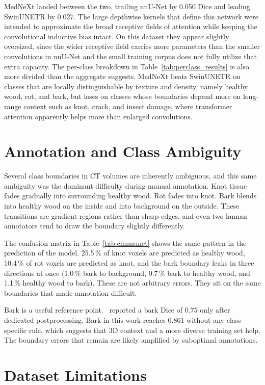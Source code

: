 MedNeXt landed between the two, trailing nnU-Net by 0.050 Dice and leading SwinUNETR by 0.027. The large depthwise kernels that define this network were intended to approximate the broad receptive fields of attention while keeping the convolutional inductive bias intact. On this dataset they appear slightly oversized, since the wider receptive field carries more parameters than the smaller convolutions in nnU-Net and the small training corpus does not fully utilize that extra capacity. The per-class breakdown in Table~\ref{tab:perclass_results} is also more divided than the aggregate suggests. MedNeXt beats SwinUNETR on classes that are locally distinguishable by texture and density, namely healthy wood, rot, and bark, but loses on classes whose boundaries depend more on long-range context such as knot, crack, and insect damage, where transformer attention apparently helps more than enlarged convolutions.
\section{Annotation and Class Ambiguity}

Several class boundaries in CT volumes are inherently ambiguous, and this same ambiguity was the dominant difficulty during manual annotation. Knot tissue fades gradually into surrounding healthy wood. Rot fades into knot. Bark blends into healthy wood on the inside and into background on the outside. These transitions are gradient regions rather than sharp edges, and even two human annotators tend to draw the boundary slightly differently.

The confusion matrix in Table~\ref{tab:cmnnunet} shows the same pattern in the prediction of the model. 25.5\,\% of knot voxels are predicted as healthy wood, 10.4\,\% of rot voxels are predicted as knot, and the bark boundary leaks in three directions at once (1.0\,\% bark to background, 0.7\,\% bark to healthy wood, and 1.1\,\% healthy wood to bark). These are not arbitrary errors. They sit on the same boundaries that made annotation difficult.

Bark is a useful reference point.~\cite{gergel2026wood} reported a bark Dice of 0.75 only after dedicated postprocessing. Bark in this work reaches 0.861 without any class specific rule, which suggests that 3D context and a more diverse training set help. The boundary errors that remain are likely amplified by suboptimal annotations.

\section{Dataset Limitations}

